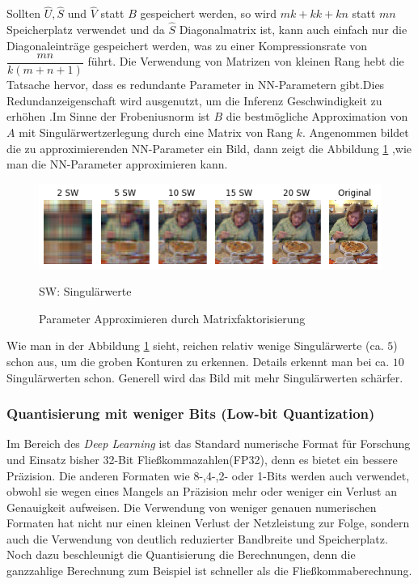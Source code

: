 \documentclass[12pt,a4paper]{scrartcl}
\numberwithin{equation}{section}
\begin{document}
Sollten $ \widehat{U} , \widehat{S} $ und $ \widehat{V} $ statt $ B $ gespeichert werden, so wird $ m k + k k + k n $ statt $ mn $ Speicherplatz verwendet und da $ \widehat{S} $ Diagonalmatrix ist, kann auch einfach nur die Diagonaleinträge gespeichert werden, was zu einer Kompressionsrate von $ \dfrac{mn}{k(m+n+1)} $ führt. Die Verwendung von Matrizen von kleinen Rang hebt die Tatsache hervor, dass es redundante Parameter in \ac{NN}-Parametern gibt.Dies Redundanzeigenschaft wird ausgenutzt, um die Inferenz Geschwindigkeit zu erhöhen \cite[Denton et al]{matrix quantization}.Im Sinne der Frobeniusnorm ist $ B $ die bestmögliche Approximation von $ A $ mit Singulärwertzerlegung durch eine Matrix von Rang $ k $.
Angenommen bildet die zu approximierenden NN-Parameter ein Bild, dann zeigt die Abbildung \ref{fig:matrix_fatorization} ,wie man die NN-Parameter approximieren kann.

\begin{figure}[h]
	\centering
	\includegraphics[width=\textwidth]{matrix_fatorization}
	\begin{center}
		SW: Singulärwerte
	\end{center}
	\caption{Parameter Approximieren durch Matrixfaktorisierung }
	\label{fig:matrix_fatorization}
\end{figure}
Wie man in der Abbildung \ref{fig:matrix_fatorization} sieht, reichen  relativ wenige Singulärwerte (ca. $ 5 $) schon aus, um die groben Konturen zu erkennen. Details erkennt man bei ca. $ 10 $ Singulärwerten schon. Generell wird das Bild mit mehr Singulärwerten schärfer.

\subsubsection{Quantisierung mit weniger Bits (Low-bit Quantization)}
Im Bereich des \textit{Deep Learning} ist das Standard numerische Format für Forschung und Einsatz bisher 32-Bit Fließkommazahlen(FP32), denn es bietet ein bessere Präzision. Die anderen Formaten wie 8-,4-,2- oder 1-Bits werden auch verwendet, obwohl sie wegen eines Mangels an Präzision mehr oder weniger ein Verlust an Genauigkeit aufweisen.
Die Verwendung von weniger genauen numerischen Formaten hat nicht nur einen kleinen Verlust der Netzleistung zur Folge, sondern auch die Verwendung von deutlich reduzierter Bandbreite und Speicherplatz. Noch dazu beschleunigt die Quantisierung die Berechnungen, denn die ganzzahlige Berechnung zum Beispiel ist schneller als die Fließkommaberechnung\cite{quantizationYoni}.
\end{document}
